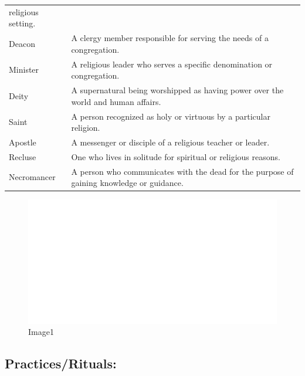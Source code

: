 \begin{longtable}[]{@{}
  >{\raggedright\arraybackslash}p{}
  >{\raggedright\arraybackslash}p{}@{}}
religious setting. \\
Deacon & A clergy member responsible for serving the needs of a
congregation. \\
Minister & A religious leader who serves a specific denomination or
congregation. \\
Deity & A supernatural being worshipped as having power over the world
and human affairs. \\
Saint & A person recognized as holy or virtuous by a particular
religion. \\
Apostle & A messenger or disciple of a religious teacher or leader. \\
Recluse & One who lives in solitude for spiritual or religious
reasons. \\
Necromancer & A person who communicates with the dead for the purpose of
gaining knowledge or guidance. \\
\bottomrule
\end{longtable}

\begin{figure}
\centering
\includegraphics{./images/religion02.svg}
\caption{Image1}
\end{figure}

\hypertarget{practicesrituals}{%
\subsection{Practices/Rituals:}\label{practicesrituals}}

